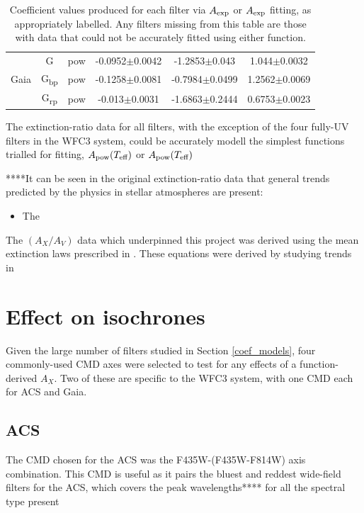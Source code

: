 \documentclass[12pt, a4paper]{report}
\begin{document}
\begin{table}
\begin{center}
\begin{tabular}{cccccc}
& G & pow & -0.0952$\pm$0.0042 & -1.2853$\pm$0.043 & 1.044$\pm$0.0032 \\
Gaia & G\textsubscript{bp} & pow & -0.1258$\pm$0.0081 & -0.7984$\pm$0.0499 & 1.2562$\pm$0.0069 \\
& G\textsubscript{rp} & pow & -0.013$\pm$0.0031 & -1.6863$\pm$0.2444 & 0.6753$\pm$0.0023 \\ \hline

\end{tabular}
\caption{Coefficient values produced for each filter via $A_{\textnormal{exp}}$ or $A_{\textnormal{exp}}$ fitting, as appropriately labelled. Any filters missing from this table are those with data that could not be accurately fitted using either function.}
\label{simpfunc_coeffs_table}
\end{center}
\end{table}

The extinction-ratio data for all filters, with the exception of the four fully-UV filters in the WFC3 system, could be accurately modell the simplest functions trialled for fitting, $A_{\textnormal{pow}} (T_{\textnormal{eff}})$ or $A_{\textnormal{pow}} (T_{\textnormal{eff}})$

****It can be seen in the original extinction-ratio data that general trends predicted by the physics in stellar atmospheres are present:
\begin{itemize}
\item The 
\end{itemize}

The $(A_{X}/A_{V})$ data which underpinned this project was derived using the mean extinction laws prescribed in \citep{1989ApJ...345..245C}. These equations were derived by studying trends in 

\section{Effect on isochrones}
Given the large number of filters studied in Section \ref{coef_models}, four commonly-used CMD axes were selected to test for any effects of a function-derived $A_{X}$. Two of these are specific to the WFC3 system, with one CMD each for ACS and Gaia.
\subsection{ACS} \label{ACS_isoc}

The CMD chosen for the ACS was the F435W-(F435W-F814W) axis combination. This CMD is useful as it pairs the bluest and reddest wide-field filters for the ACS, which covers the peak wavelengths**** for all the spectral type present
\end{document}
